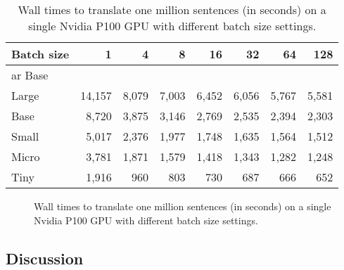\begin{table}
  \centering

  \begin{tabular}{lrrrrrrr}
    \toprule
    Batch size & 1 & 4 & 8 & 16 & 32 & 64 & 128\\
    \midrule
    \acs{ar} Base &  &  &  &  &  &  & \\
    \midrule
    Large & 14,157 & 8,079 & 7,003 & 6,452 & 6,056 & 5,767 & 5,581 \\
    Base  &  8,720 & 3,875 & 3,146 & 2,769 & 2,535 & 2,394 & 2,303 \\
    Small &  5,017 & 2,376 & 1,977 & 1,748 & 1,635 & 1,564 & 1,512 \\
    Micro &  3,781 & 1,871 & 1,579 & 1,418 & 1,343 & 1,282 & 1,248 \\
    Tiny  &  1,916 &   960 &   803 &   730 &   687 &   666 &   652 \\
    \bottomrule
  \end{tabular}

  \caption{Wall times to translate one million sentences (in seconds) on a
    single Nvidia P100 GPU with different batch size settings.}
  \label{tab:throughput:p100}

\end{table}


\begin{figure}
  \centering
  

  \caption{Wall times to translate one million sentences (in seconds) on a
    single Nvidia P100 GPU with different batch size settings.}%
  \label{fig:throughput:p100}
\end{figure}

\subsection{Discussion}%
\label{subsec:results:discussion}


